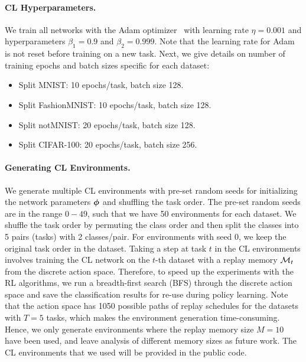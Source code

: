 \vspace{-3mm}
\paragraph{CL Hyperparameters.} We train all networks with the Adam optimizer~ with learning rate $\eta = 0.001$ and hyperparameters $\beta_1 = 0.9$ and $\beta_2 = 0.999$. Note that the learning rate for Adam is not reset before training on a new task. Next, we give details on number of training epochs and batch sizes specific for each dataset:
\begin{itemize}[topsep=1pt,noitemsep]
    \item Split MNIST: 10 epochs/task, batch size 128.
    \item Split FashionMNIST: 10 epochs/task, batch size 128.
    \item Split notMNIST: 20 epochs/task, batch size 128.
    \item Split CIFAR-100: 20 epochs/task, batch size 256.
\end{itemize}

\vspace{-3mm}
\paragraph{Generating CL Environments.} We generate multiple CL environments with pre-set random seeds for initializing the network parameters ${\bm{\phi}}$ and shuffling the task order. The pre-set random seeds are in the range $0-49$, such that we have 50 environments for each dataset. We shuffle the task order by permuting the class order and then split the classes into 5 pairs (tasks) with 2 classes/pair. For environments with seed $0$, we keep the original task order in the dataset. 
Taking a step at task $t$ in the CL environments involves training the CL network on the $t$-th dataset with a replay memory ${\mathcal{M}}_t$ from the discrete action space. %
Therefore, to speed up the experiments with the RL algorithms, we run a breadth-first search (BFS) through the discrete action space and save the classification results for re-use during policy learning. Note that the action space has 1050 possible paths of replay schedules for the datasets with $T=5$ tasks, which makes the environment generation time-consuming. Hence, we only generate environments where the replay memory size $M=10$ have been used, and leave analysis of different memory sizes as future work. The CL environments that we used will be provided in the public code. 

